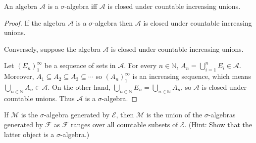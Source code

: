 \newpage

\begin{exercise}
    An algebra \( \mathcal{A} \) is a \( \sigma \)-algebra iff \( \mathcal{A} \) is closed under countable increasing unions.
\end{exercise}

\begin{proof}
    If the algebra \( \mathcal{A} \) is a \( \sigma \)-algebra then \( \mathcal{A} \) is closed under countable increasing unions.

    Conversely, suppose the algebra \( \mathcal{A} \) is closed under countable increasing unions.

    Let \( {(E_{n})}_{1}^{\infty} \) be a sequence of sets in \( \mathcal{A} \). For every \( n \in \mathbb{N} \), \( A_{n} = \bigcup_{i=1}^{n} E_{i} \in \mathcal{A} \). Moreover, \( A_{1} \subseteq A_{2} \subseteq A_{3} \subseteq \cdots \) so \( {(A_{n})}_{1}^{\infty} \) is an increasing sequence, which means \( \bigcup_{n \in \mathbb{N}} A_{n} \in \mathcal{A} \). On the other hand, \( \bigcup_{n \in \mathbb{N}} E_{n} = \bigcup_{n \in \mathbb{N}} A_{n} \), so \( \mathcal{A} \) is closed under countable unions. Thus \( \mathcal{A} \) is a \( \sigma \)-algebra.
\end{proof}

\newpage

\begin{exercise}
    If \( \mathcal{M} \) is the \( \sigma \)-algebra generated by \( \mathcal{E} \), then \( \mathcal{M} \) is the union of the \( \sigma \)-algebras generated by \( \mathcal{F} \) as \( \mathcal{F} \) ranges over all countable subsets of \( \mathcal{E} \). (Hint: Show that the latter object is a \( \sigma \)-algebra.)
\end{exercise}


